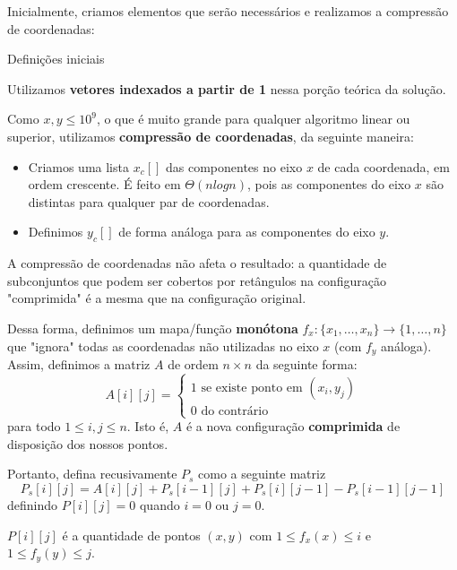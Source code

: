 \documentclass{article}
\begin{document}
\begin{solutionenv}
Inicialmente, criamos elementos que serão necessários e realizamos a compressão de coordenadas:
\begin{generic}{Definições iniciais}{}

    Utilizamos \textbf{vetores indexados a partir de 1} nessa porção teórica da solução.

    Como \(x, y \leq 10^9\), o que é muito grande para qualquer algoritmo linear ou superior, utilizamos \textbf{compressão de coordenadas}, da seguinte maneira: 
    \begin{itemize}
        \item Criamos uma lista \(x_c[]\) das componentes no eixo \(x\) de cada coordenada, em ordem crescente. É feito em \(\Theta(n log n)\), pois as componentes do eixo \(x\) são distintas para qualquer par de coordenadas.
        \item Definimos \(y_c[]\) de forma análoga para as componentes do eixo \(y\). 
    \end{itemize}


    \begin{lemma}
        A compressão de coordenadas não afeta o resultado: a quantidade de subconjuntos que podem ser cobertos por retângulos na configuração "comprimida" é a mesma que na configuração original.
    \end{lemma}

    Dessa forma, definimos um mapa/função \textbf{monótona} \(f_x: \{x_1, \dotsc, x_n\} \to \{1, \dotsc, n\}\) que "ignora" todas as coordenadas não utilizadas no eixo \(x\) (com \(f_y\) análoga). Assim, definimos a matriz \(A\) de ordem \(n \times n\) da seguinte forma:
    \[
    A[i][j] = \begin{cases}
        1 \text{ se existe ponto em } (x_i, y_j) \\
        0 \text{ do contrário }
    \end{cases}    
    \]
    para todo \(1 \leq i, j \leq n\). Isto é, \(A\) é a nova configuração \textbf{comprimida} de disposição dos nossos pontos.

    Portanto, defina recusivamente \(P_s\) como a seguinte matriz  
    \[
        P_s[i][j] = A[i][j] + P_s[i - 1][j] + P_s[i][j - 1] - P_s[i - 1][j - 1]
    \]
    definindo \(P[i][j] = 0\) quando \(i = 0\) ou \(j = 0\).
    \begin{lemma}\label{2d-prefixsum}
        \(P[i][j]\) é a quantidade de pontos \((x, y)\) com \(1 \leq f_x(x) \leq i\) e \(1 \leq f_y(y) \leq j\).


\end{lemma}
\end{generic}
\end{solutionenv}
\end{document}
